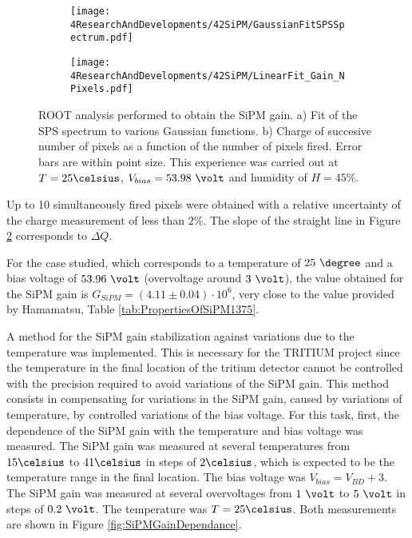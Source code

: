\begin{figure}
\centering
    \begin{subfigure}[b]{0.9\textwidth}
    \centering
    \texttt{[image: 4ResearchAndDevelopments/42SiPM/GaussianFitSPSSpectrum.pdf]}  
    \caption{\label{subfig:GaussianFitSiPMs}}
    \end{subfigure}
    \hfill
    \begin{subfigure}[b]{0.9\textwidth}
    \centering
    \texttt{[image: 4ResearchAndDevelopments/42SiPM/LinearFit\_Gain\_NPixels.pdf]}  
    \caption{\label{subfig:LinearFitSiPMGain}}
    \end{subfigure}
 \caption{ROOT analysis performed to obtain the SiPM gain. a) Fit of the SPS spectrum to various Gaussian functions. b) Charge of succesive number of pixels as a function of the number of pixels fired. Error bars are within point size. This experience was carried out at $T=25\celsius$, $V_{bias}=53.98~\volt$ and humidity of $H=45\%$.}
 \label{fig:ROOTAnalysisSiPMGain}
\end{figure}


Up to 10 simultaneously fired pixels were obtained with a relative uncertainty of the charge measurement of less than $2\%$. The slope of the straight line in Figure \ref{subfig:LinearFitSiPMGain} corresponds to $\overline{\Delta Q}$.

For the case studied, which corresponds to a temperature of $25~\degree$ and a bias voltage of $53.96~\volt$ (overvoltage around $3~\volt$), the value obtained for the SiPM gain is $G_{SiPM}=(4.11 \pm 0.04) \cdot{} 10^{6}$, very close to the value provided by Hamamatsu, Table \ref{tab:PropertiesOfSiPM1375}.

A method for the SiPM gain stabilization against variations due to the temperature was implemented. This is necessary for the TRITIUM project since the temperature in the final location of the tritium detector cannot be controlled with the precision required to avoid variations of the SiPM gain. This method consists in compensating for variations in the SiPM gain, caused by variations of temperature, by controlled variations of the bias voltage. For this task, first, the dependence of the SiPM gain with the temperature and bias voltage was measured. The SiPM gain was measured at several temperatures from $15\celsius$ to $41\celsius$ in steps of $2\celsius$, which is expected to be the temperature range in the final location. The bias voltage was $V_{bias} = V_{BD}+3$. The SiPM gain was measured at several overvoltages from $1~\volt$ to $5~\volt$ in steps of $0.2~\volt$. The temperature was $T=25\celsius$. Both measurements are shown in Figure \ref{fig:SiPMGainDependance}. 


